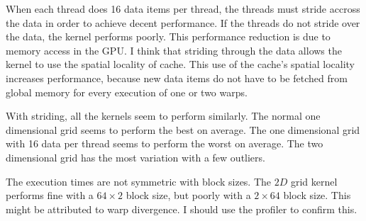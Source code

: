 \documentclass[a4paper,12pt]{article}
\begin{document}
  When each thread does 16 data items per thread, the threads must stride accross the data in order to achieve decent performance.
  If the threads do not stride over  the data, the kernel performs poorly.
  This performance reduction is due to memory access in the GPU.
  I think that striding through the data allows the kernel to use the spatial locality of cache.
  This use of the cache's spatial locality increases performance, because new data items do not have to be fetched from global memory for every execution of one or two warps.

  With striding, all the kernels seem to perform similarly.
  The normal one dimensional grid seems to perform the best on average.
  The one dimensional grid with 16 data per thread seems to perform the worst on average.
  The two dimensional grid has the most variation with a few outliers.

  The execution times are not symmetric with block sizes.
  The $2D$ grid kernel performs fine with a $64 \times 2$ block size, but poorly with a $2 \times 64$ block size.
  This might be attributed to warp divergence.
  I should use the profiler to confirm this.
\end{document}
